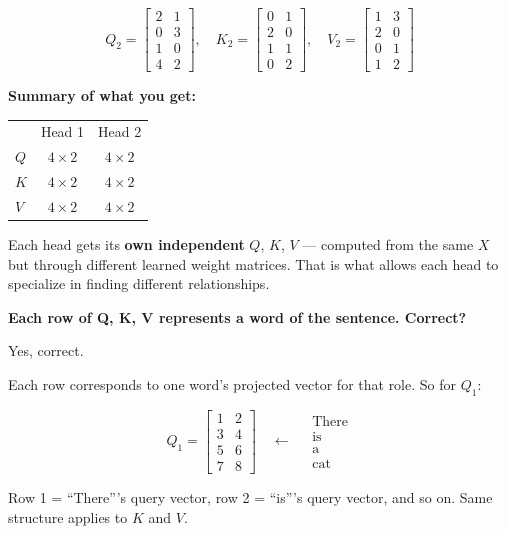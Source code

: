 \[
Q_2 = \begin{bmatrix}2&1\\0&3\\1&0\\4&2\end{bmatrix}, \quad
K_2 = \begin{bmatrix}0&1\\2&0\\1&1\\0&2\end{bmatrix}, \quad
V_2 = \begin{bmatrix}1&3\\2&0\\0&1\\1&2\end{bmatrix}
\]

\textbf{Summary of what you get:}

\begin{tabular}{lcc}
 & Head 1 & Head 2 \\[4pt]
$Q$ & $4 \times 2$ & $4 \times 2$ \\[4pt]
$K$ & $4 \times 2$ & $4 \times 2$ \\[4pt]
$V$ & $4 \times 2$ & $4 \times 2$ \\[4pt]
\end{tabular}

\medskip

Each head gets its \textbf{own independent} $Q$, $K$, $V$ --- computed from the same $X$ but through different learned weight matrices. That is what allows each head to specialize in finding different relationships.

\bigskip

\textbf{Each row of Q, K, V represents a word of the sentence. Correct?}

Yes, correct.

Each row corresponds to one word's projected vector for that role. So for $Q_1$:

\[
Q_1 = \begin{bmatrix}1&2\\3&4\\5&6\\7&8\end{bmatrix}
\quad \leftarrow \quad
\begin{array}{l} \text{There} \\ \text{is} \\ \text{a} \\ \text{cat} \end{array}
\]

Row 1 = ``There'''s query vector, row 2 = ``is'''s query vector, and so on. Same structure applies to $K$ and $V$.